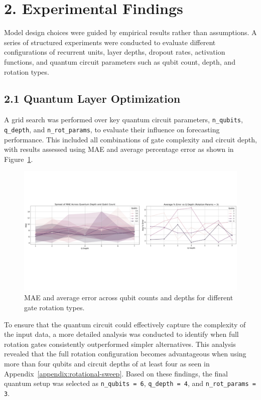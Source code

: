 \documentclass[10pt]{article}
\begin{document}
\section*{2. Experimental Findings}

Model design choices were guided by empirical results rather than assumptions. A series of structured experiments were conducted to evaluate different configurations of recurrent units, layer depths, dropout rates, activation functions, and quantum circuit parameters such as qubit count, depth, and rotation types.

\subsection*{2.1 Quantum Layer Optimization}

A grid search was performed over key quantum circuit parameters, \texttt{n\_qubits}, \texttt{q\_depth}, and \texttt{n\_rot\_params}, to evaluate their influence on forecasting performance. This included all combinations of gate complexity and circuit depth, with results assessed using MAE and average percentage error as shown in Figure~\ref{fig:quantum analysis}.

\begin{figure}[H]
    \centering
    \includegraphics[trim=0cm 8cm 0cm 6.5cm,clip,width=0.8\paperwidth]{images/quantum analysis.png}
    \caption{MAE and average error across qubit counts and depths for different gate rotation types.}
    \label{fig:quantum analysis}
\end{figure}

To ensure that the quantum circuit could effectively capture the complexity of the input data, a more detailed analysis was conducted to identify when full rotation gates consistently outperformed simpler alternatives. This analysis revealed that the full rotation configuration becomes advantageous when using more than four qubits and circuit depths of at least four as seen in Appendix~\ref{appendix:rotational-sweep}. Based on these findings, the final quantum setup was selected as \texttt{n\_qubits = 6}, \texttt{q\_depth = 4}, and \texttt{n\_rot\_params = 3}.
\end{document}
